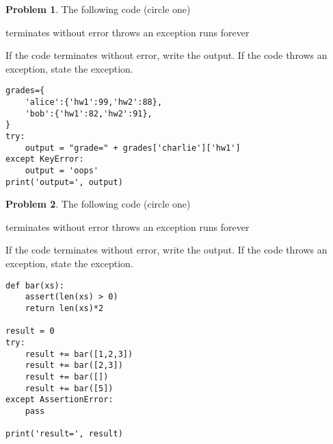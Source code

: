 \documentclass[10pt]{article}
\theoremstyle{definition}
\newtheorem{problem}{Problem}
\begin{document}
\begin{problem}
    The following code (circle one)

    \vspace{0.25in}
    \hspace{0.5in}terminates without error 
    \hspace{1in}throws an exception
    \hspace{1in}runs forever
    \vspace{0.25in}

    \noindent
    If the code terminates without error, write the output.
    If the code throws an exception, state the exception.
\end{problem}
\begin{lstlisting}
grades={
    'alice':{'hw1':99,'hw2':88},
    'bob':{'hw1':82,'hw2':91},
}
try:
    output = "grade=" + grades['charlie']['hw1']
except KeyError:
    output = 'oops'
print('output=', output)
\end{lstlisting}
\vspace{0.75in}

\newpage
\begin{problem}
    The following code (circle one)

    \vspace{0.25in}
    \hspace{0.5in}terminates without error 
    \hspace{1in}throws an exception
    \hspace{1in}runs forever
    \vspace{0.25in}

    \noindent
    If the code terminates without error, write the output.
    If the code throws an exception, state the exception.
\end{problem}
\begin{lstlisting}
def bar(xs):
    assert(len(xs) > 0)
    return len(xs)*2

result = 0
try:
    result += bar([1,2,3])
    result += bar([2,3])
    result += bar([])
    result += bar([5])
except AssertionError:
    pass

print('result=', result)
\end{lstlisting}
\vspace{0.75in}
\end{document}
